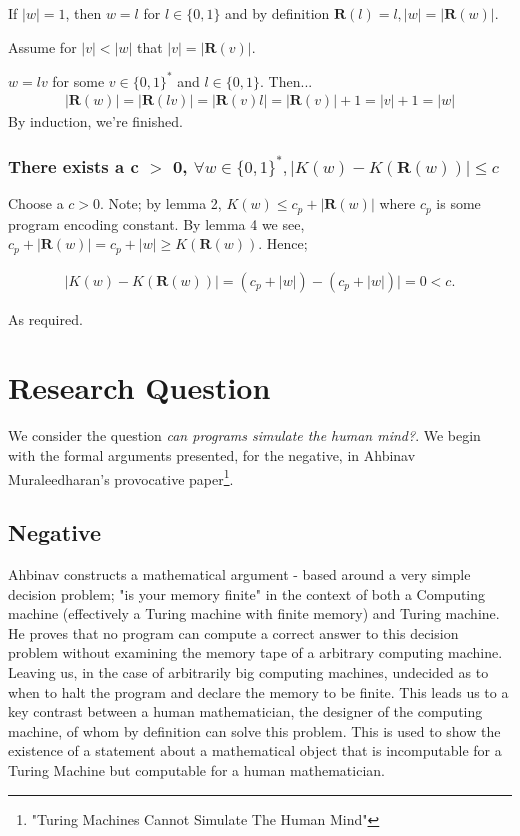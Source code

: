 \documentclass{article}
\begin{document}
If $|w| = 1$, then $w = l$ for $l\in \{0,1\}$ and by definition $\bm{R}(l) = l, |w|=|\bm{R}(w)|$.

Assume for $|v| < |w|$ that $|v| = |\bm{R}(v)|$.

$w = lv$ for some $v \in \{0,1\}^*$ and $l \in \{0,1\}$. Then...
\begin{align*}
	|\bm{R}(w)| = |\bm{R}(lv)| = |\bm{R}(v)l| = |\bm{R}(v)|+1 = |v|+1 = |w|
\end{align*}
By induction, we're finished.

\subsubsection*{There exists a c $>$ 0, $\forall w \in \{0,1\}^*, |K(w) - K(\bm{R}(w))| \leq c$}
Choose a $c > 0$. Note; by lemma 2, $K(w) \leq c_p + |\bm{R}(w)|$ where $c_p$ is some program encoding constant. By lemma 4 we see, $c_p + |\bm{R}(w)| = c_p + |w| \geq K(\bm{R}(w))$. Hence;

\begin{align*}
	|K(w) - K(\bm{R}(w))| = (c_p + |w|) - (c_p + |w|)| = 0 < c.
\end{align*}

As required.

\pagebreak
\section*{Research Question}
We consider the question \emph{can programs simulate the human mind?}. We begin with the formal arguments presented, for the negative, in Ahbinav Muraleedharan's provocative paper\footnote{"Turing Machines Cannot Simulate The Human Mind"}.

\subsection*{Negative}
Ahbinav constructs a mathematical argument - based around a very simple decision problem; "is your memory finite" in the context of both a Computing machine (effectively a Turing machine with finite memory) and Turing machine. He proves that no program can compute a correct answer to this decision problem without examining the memory tape of a arbitrary computing machine.\cite{ahbinav} Leaving us, in the case of arbitrarily big computing machines, undecided as to when to halt the program and declare the memory to be finite. This leads us to a key contrast between a human mathematician, the designer of the computing machine, of whom by definition can solve this problem. This is used to show the existence of a statement about a mathematical object that is incomputable for a Turing Machine but computable for a human mathematician. 
\end{document}
